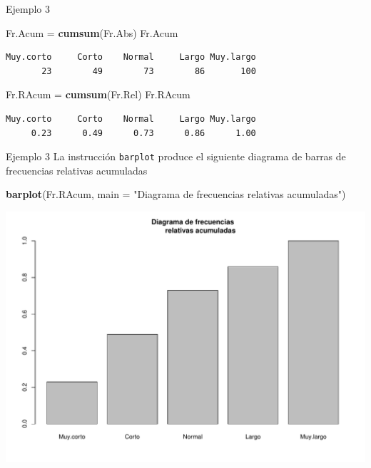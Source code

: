 \documentclass[
  ignorenonframetext,
]{beamer}
\newenvironment{Shaded}{\begin{snugshade}}{\end{snugshade}}
\newcommand{\AttributeTok}[1]{\textcolor[rgb]{0.13,0.29,0.53}{#1}}
\newcommand{\FunctionTok}[1]{\textcolor[rgb]{0.13,0.29,0.53}{\textbf{#1}}}
\newcommand{\NormalTok}[1]{#1}
\newcommand{\OtherTok}[1]{\textcolor[rgb]{0.56,0.35,0.01}{#1}}
\newcommand{\StringTok}[1]{\textcolor[rgb]{0.31,0.60,0.02}{#1}}
\begin{document}
\begin{frame}[fragile]{Ejemplo 3}
\label{ejemplo-3-3}
\begin{Shaded}
\begin{Highlighting}[]
\NormalTok{Fr.Acum }\OtherTok{=} \FunctionTok{cumsum}\NormalTok{(Fr.Abs)}
\NormalTok{Fr.Acum}
\end{Highlighting}
\end{Shaded}

\begin{verbatim}
Muy.corto     Corto    Normal     Largo Muy.largo 
       23        49        73        86       100 
\end{verbatim}

\begin{Shaded}
\begin{Highlighting}[]
\NormalTok{Fr.RAcum }\OtherTok{=} \FunctionTok{cumsum}\NormalTok{(Fr.Rel)}
\NormalTok{Fr.RAcum}
\end{Highlighting}
\end{Shaded}

\begin{verbatim}
Muy.corto     Corto    Normal     Largo Muy.largo 
     0.23      0.49      0.73      0.86      1.00 
\end{verbatim}
\end{frame}

\begin{frame}[fragile]{Ejemplo 3}
\label{ejemplo-3-4}
La instrucción \texttt{barplot} produce el siguiente diagrama de barras
de frecuencias relativas acumuladas

\begin{Shaded}
\begin{Highlighting}[]
\FunctionTok{barplot}\NormalTok{(Fr.RAcum, }\AttributeTok{main =} \StringTok{"Diagrama de frecuencias}
\StringTok{        relativas acumuladas"}\NormalTok{)}
\end{Highlighting}
\end{Shaded}

\includegraphics[width=0.6\linewidth]{R_base_files/figure-beamer/unnamed-chunk-120-1}
\end{frame}
\end{document}

